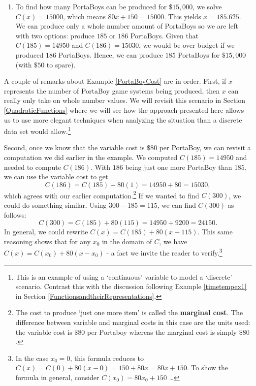 \documentclass{ximera}
\begin{document}
\begin{example}
\begin{enumerate}
\item  To find how many PortaBoys can be produced for $\$15, \! 000$, we solve $C(x) = 15000$, which means $80x+150 = 15000$.  This yields  $x = 185.625$.  We can produce only a whole number amount of PortaBoys so we are left with two options: produce $185$ or $186$ PortaBoys.  Given that $C(185) =  14950$ and $C(186) = 15030$, we would be over budget if we produced $186$ PortaBoys.  Hence, we can produce $185$ PortaBoys for $\$15, \! 000$ (with $\$50$ to spare). 

\end{enumerate}

\end{example}

A couple of remarks about Example \ref{PortaBoyCost} are in order.  First, if $x$ represents the number of PortaBoy game systems being produced, then $x$ can really only take on whole number values.  We will revisit this scenario in Section \ref{QuadraticFunctions} where we will see how the approach presented here allows us to use more elegant techniques when analyzing the situation than a discrete data set would allow.\footnote{This is an example of using a `continuous' variable to model a `discrete' scenario.  Contrast this with the discussion following Example \ref{timetempex1} in Section \ref{FunctionsandtheirRepresentations}.} 



Second, once we know that the variable cost is $\$80$ per PortaBoy, we can revisit a computation we did earlier in the example.  We computed $C(185) = 14950$ and needed to compute $C(186)$.  With $186$ being just one more PortaBoy than $185$, we can use the variable cost to get \[C(186) = C(185) + 80(1) =  14950 + 80 = 15030,\] which agrees with our earlier computation.\footnote{The cost to produce `just one more item' is called the  \textbf{marginal cost}.  The difference between variable and marginal costs in this case are the units used: the variable cost is $\$ 80$ per Portaboy whereas the marginal cost is simply $\$80$.}  If we wanted to find $C(300)$, we could do something similar.  Using $300 - 185 = 115$, we can find $C(300)$ as follows: \[C(300) = C(185) + 80(115) = 14950 + 9200 = 24150.\] In general, we could rewrite  $C(x) = C(185) + 80(x - 115)$. This same reasoning shows that for any $x_0$ in the domain of $C$, we have $C(x) = C(x_0) + 80(x - x_0)$ - a fact we invite the reader to verify.\footnote{In the case $x_{0} = 0$, this formula reduces to $C(x) = C(0) + 80(x - 0) = 150 + 80x = 80x + 150$.  To show the formula in general, consider $C(x_{0}) = 80x_{0} + 150$ \ldots}   
\end{document}
